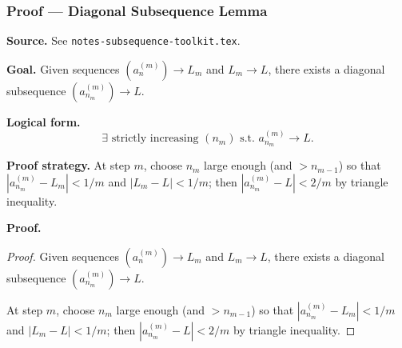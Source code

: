 

\clearpage
{}
\hypertarget{proof-RA-ABB-T-diagonal-subseq}{}

\subsubsection[Diagonal Subsequence Lemma]{Proof --- Diagonal Subsequence Lemma}

\bigskip

\noindent
\textbf{Source.}
See \texttt{notes-subsequence-toolkit.tex}.

\vspace{0.75em}

\noindent
\textbf{Goal.}
Given sequences $(a_n^{(m)}) \to L_m$ and $L_m \to L$, there exists a diagonal subsequence $(a_{n_m}^{(m)}) \to L$.

\vspace{0.75em}

\noindent
\textbf{Logical form.}
\[
  \exists \text{ strictly increasing } (n_m) \text{ s.t.\ } a_{n_m}^{(m)} \to L.
\]

\vspace{0.75em}

\noindent
\textbf{Proof strategy.}
At step $m$, choose $n_m$ large enough (and $> n_{m-1}$) so that $|a_{n_m}^{(m)} - L_m| < 1/m$ and $|L_m - L| < 1/m$; then $|a_{n_m}^{(m)} - L| < 2/m$ by triangle inequality.

\vspace{0.75em}

\noindent
\textbf{Proof.}
\begin{proof}
\Claim Given sequences $(a_n^{(m)}) \to L_m$ and $L_m \to L$, there exists a diagonal subsequence $(a_{n_m}^{(m)}) \to L$.

\Given 

\Goal 

\Strategy At step $m$, choose $n_m$ large enough (and $> n_{m-1}$) so that $|a_{n_m}^{(m)} - L_m| < 1/m$ and $|L_m - L| < 1/m$; then $|a_{n_m}^{(m)} - L| < 2/m$ by triangle inequality.

\medskip


\end{proof}

